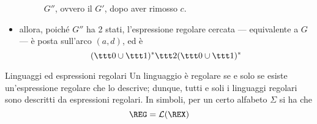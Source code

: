 \documentclass[a4paper, 12pt]{report}
\begin{document}
\begin{example}
\begin{itemize}
\begin{figure}[H]
                     \caption{$G''$, ovvero il \GNFA $G'$, dopo aver rimosso $c$.}
                \end{figure}

            \item allora, poiché $G''$ ha 2 stati, l'espressione regolare cercata --- equivalente a $G$ --- è posta sull'arco $(a,d)$, ed è $$(\ttt 0 \cup \ttt 1)^* \ttt 2 (\ttt 0 \cup \ttt 1)^*$$
        \end{itemize}
    \end{example}

    \begin{framedthm}[label={ling expr reg}]{Linguaggi ed espressioni regolari}
        Un linguaggio è regolare se e solo se esiste un'espressione regolare che lo descrive; dunque, tutti e soli i linguaggi regolari sono descritti da espressioni regolari. In simboli, per un certo alfabeto $\Sigma$ si ha che $$\mathrm{\REG} = \mathcal{L}(\REX)$$
    \end{framedthm}
\end{document}
